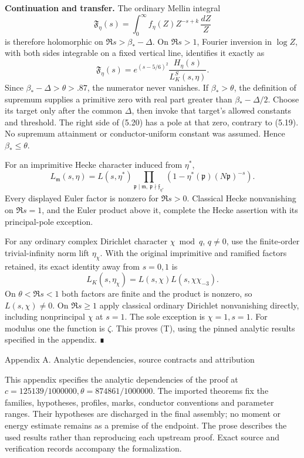 \documentclass[11pt,a4paper]{article}
\begin{document}
\textbf{Continuation and transfer.} The ordinary Mellin integral \[
\mathfrak F_\eta(s)=
\int_0^\infty f_\eta(Z)Z^{-s+k}\,\frac{dZ}{Z}
\tag{5.19}
\] is therefore holomorphic on \(\Re s>\beta_*-\Delta\). On \(\Re s>1\),
Fourier inversion in \(\log Z\), with both sides integrable on a fixed
vertical line, identifies it exactly as \[
\mathfrak F_\eta(s)=
e^{(s-5/6)^2}\frac{H_\eta(s)}{L_K^S(s,\eta)}.
\tag{5.20}
\] Since \(\beta_*-\Delta>\theta>.87\), the numerator never vanishes. If
\(\beta_*>\theta\), the definition of supremum supplies a primitive zero
with real part greater than \(\beta_*-\Delta/2\). Choose its target only
after the common \(\Delta\), then invoke that target's allowed constants
and threshold. The right side of (5.20) has a pole at that zero,
contrary to (5.19). No supremum attainment or conductor-uniform constant
was assumed. Hence \(\beta_*\le\theta\).

For an imprimitive Hecke character induced from \(\eta^*\), \[
L_{\mathfrak m}(s,\eta)=L(s,\eta^*)
\prod_{\mathfrak p\mid\mathfrak m,\ \mathfrak p\nmid\mathfrak f_{\eta^*}}
\left(1-\eta^*(\mathfrak p)(N\mathfrak p)^{-s}\right).
\tag{5.21}
\] Every displayed Euler factor is nonzero for \(\Re s>0\). Classical
Hecke nonvanishing on \(\Re s=1\), and the Euler product above it,
complete the Hecke assertion with its principal-pole exception.

For any ordinary complex Dirichlet character \(\chi\bmod q\), \(q\ne0\),
use the finite-order trivial-infinity norm lift \(\eta_\chi\). With the
original imprimitive and ramified factors retained, its exact identity
away from \(s=0,1\) is \[
L_K(s,\eta_\chi)=L(s,\chi)L(s,\chi\chi_{-3}).
\tag{5.22}
\] On \(\theta<\Re s<1\) both factors are finite and the product is
nonzero, so \(L(s,\chi)\ne0\). On \(\Re s\ge1\) apply classical ordinary
Dirichlet nonvanishing directly, including nonprincipal \(\chi\) at
\(s=1\). The sole exception is \(\chi=1,s=1\). For modulus one the
function is \(\zeta\). This proves (T), using the pinned analytic
results specified in the appendix. ∎

Appendix A. Analytic dependencies, source contracts and attribution

This appendix specifies the analytic dependencies of the proof at
\(c=125139/1000000,\theta=874861/1000000\). The imported theorems fix
the families, hypotheses, profiles, marks, conductor conventions and
parameter ranges. Their hypotheses are discharged in the final assembly;
no moment or energy estimate remains as a premise of the endpoint. The
prose describes the used results rather than reproducing each upstream
proof. Exact source and verification records accompany the
formalization.
\end{document}
